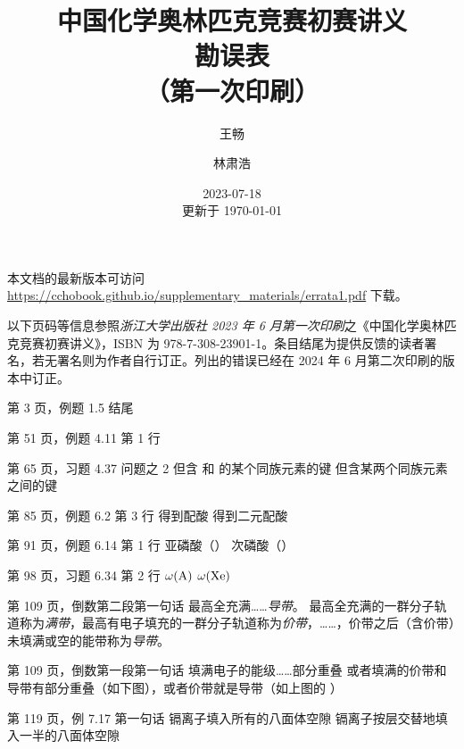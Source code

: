 \documentclass{errata}
\title{中国化学奥林匹克竞赛初赛讲义 \\ {\bfseries 勘误表} \\ （第一次印刷）}
\author{王畅 \and 林肃浩}
\date{2023-07-18 \\ 更新于 \today}
\begin{document}
    \maketitle
    本文档的最新版本可访问 \url{https://cchobook.github.io/supplementary_materials/errata1.pdf} 下载。

    以下页码等信息参照\emph{浙江大学出版社 2023 年 6 月第一次印刷}之《中国化学奥林匹克竞赛初赛讲义》，ISBN 为 978-7-308-23901-1。条目结尾为提供反馈的读者署名，若无署名则为作者自行订正。列出的错误已经在 2024 年 6 月第二次印刷的版本中订正。

    \begin{Errata}
        \item[第 3 页，例题 1.5 结尾]
            \Orig {}
            \Corr {}
        \item[第 51 页，例题 4.11 第 1 行]
            \Orig {}
            \Corr {}
        \item[第 65 页，习题 4.37 问题之 2 \cite{otten2009complexation}]
            \Orig 但含  和  的某个同族元素的键
            \Corr 但含某两个同族元素之间的键
        \item[第 85 页，例题 6.2 第 3 行]
            \Orig 得到配酸 
            \Corr 得到二元配酸 
        \item[第 91 页，例题 6.14 第 1 行]
            \Orig 亚磷酸（）
            \Corr 次磷酸（）
        \item[第 98 页，习题 6.34 第 2 行]
            \Orig $\omega(\ce{A})$
            \Corr $\omega(\ce{Xe})$
        \item[第 109 页，倒数第二段第一句话]
            \Orig 最高全充满……\emph{导带}。
            \Corr 最高全充满的一群分子轨道称为\emph{满带}，最高有电子填充的一群分子轨道称为\emph{价带}，……，价带之后（含价带）未填满或空的能带称为\emph{导带}。
        \item[第 109 页，倒数第一段第一句话]
            \Orig 填满电子的能级……部分重叠
            \Corr 或者填满的价带和导带有部分重叠（如下图），或者价带就是导带（如上图的 ）
        \item[第 119 页，例 7.17 第一句话]
            \Orig 镉离子填入所有的八面体空隙
            \Corr 镉离子按层交替地填入一半的八面体空隙

\end{Errata}
\end{document}

